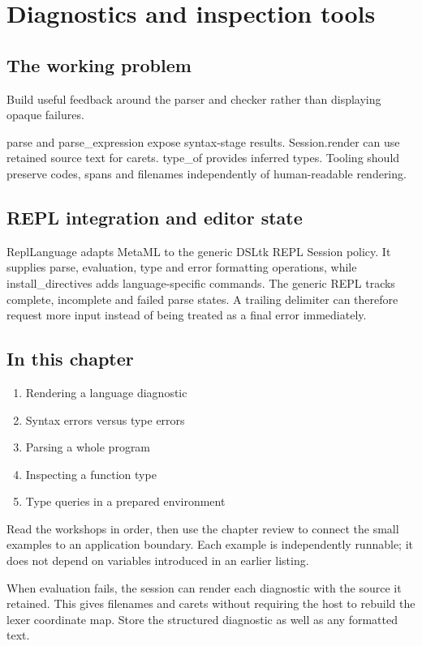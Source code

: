 \chapter{Diagnostics and inspection tools}\label{ch:20}
\section*{The working problem}
Build useful feedback around the parser and checker rather than displaying opaque failures.

parse and parse\_expression expose syntax-stage results. Session.render can use retained source text for carets. type\_of provides inferred types. Tooling should preserve codes, spans and filenames independently of human-readable rendering.

\section*{REPL integration and editor state}
ReplLanguage adapts MetaML to the generic DSLtk REPL Session policy. It supplies parse, evaluation, type and error formatting operations, while install\_directives adds language-specific commands. The generic REPL tracks complete, incomplete and failed parse states. A trailing delimiter can therefore request more input instead of being treated as a final error immediately.

\section*{In this chapter}
\begin{enumerate}
\item Rendering a language diagnostic
\item Syntax errors versus type errors
\item Parsing a whole program
\item Inspecting a function type
\item Type queries in a prepared environment
\end{enumerate}
Read the workshops in order, then use the chapter review to connect the small examples to an application boundary. Each example is independently runnable; it does not depend on variables introduced in an earlier listing.

\clearpage
{}
When evaluation fails, the session can render each diagnostic with the source it retained. This gives filenames and carets without requiring the host to rebuild the lexer coordinate map. Store the structured diagnostic as well as any formatted text.


